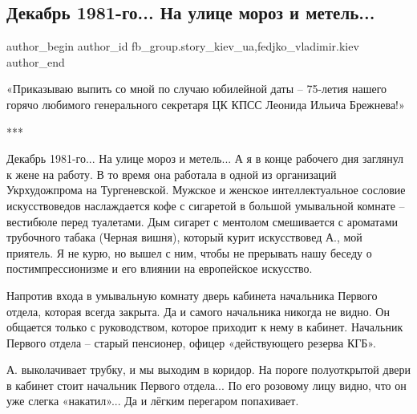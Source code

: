  
 
 
 
 
 
\subsection{Декабрь 1981-го... На улице мороз и метель...}
\label{sec:19_11_2021.fb.fb_group.story_kiev_ua.1.brezhnev}
 
\ifcmt
 author_begin
   author_id fb_group.story_kiev_ua,fedjko_vladimir.kiev
 author_end
\fi

«Приказываю выпить со мной по случаю юбилейной даты – 75-летия нашего горячо
любимого генерального секретаря ЦК КПСС Леонида Ильича Брежнева!»

***

Декабрь 1981-го... На улице мороз и метель... А я в конце рабочего дня заглянул к
жене на работу. В то время она работала в одной из организаций Укрхудожпрома на
Тургеневской.  Мужское и женское интеллектуальное сословие искусствоведов
наслаждается кофе с сигаретой в большой умывальной комнате – вестибюле перед
туалетами. Дым сигарет с ментолом смешивается с ароматами трубочного табака
(Черная вишня), который курит искусствовед А., мой приятель. Я не курю, но
вышел с ним, чтобы не прерывать нашу беседу о постимпрессионизме и его влиянии
на европейское искусство.


Напротив входа в умывальную комнату дверь кабинета начальника Первого отдела,
которая всегда закрыта. Да и самого начальника никогда не видно. Он общается
только с руководством, которое приходит к нему в кабинет. Начальник Первого
отдела – старый пенсионер, офицер «действующего резерва КГБ». 

А. выколачивает трубку, и мы выходим в коридор. На пороге полуоткрытой двери в
кабинет стоит начальник Первого отдела... По его розовому лицу видно, что он уже
слегка «накатил»... Да и лёгким перегаром попахивает.

